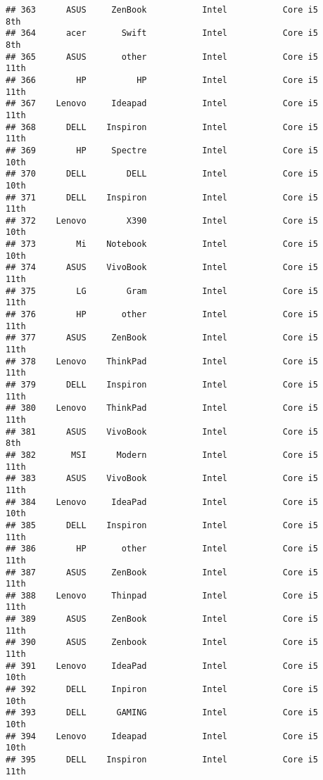\documentclass[
]{article}
\begin{document}
\begin{verbatim}
## 363      ASUS     ZenBook           Intel           Core i5             8th
## 364      acer       Swift           Intel           Core i5             8th
## 365      ASUS       other           Intel           Core i5            11th
## 366        HP          HP           Intel           Core i5            11th
## 367    Lenovo     Ideapad           Intel           Core i5            11th
## 368      DELL    Inspiron           Intel           Core i5            11th
## 369        HP     Spectre           Intel           Core i5            10th
## 370      DELL        DELL           Intel           Core i5            10th
## 371      DELL    Inspiron           Intel           Core i5            11th
## 372    Lenovo        X390           Intel           Core i5            10th
## 373        Mi    Notebook           Intel           Core i5            10th
## 374      ASUS    VivoBook           Intel           Core i5            11th
## 375        LG        Gram           Intel           Core i5            11th
## 376        HP       other           Intel           Core i5            11th
## 377      ASUS     ZenBook           Intel           Core i5            11th
## 378    Lenovo    ThinkPad           Intel           Core i5            11th
## 379      DELL    Inspiron           Intel           Core i5            11th
## 380    Lenovo    ThinkPad           Intel           Core i5            11th
## 381      ASUS    VivoBook           Intel           Core i5             8th
## 382       MSI      Modern           Intel           Core i5            11th
## 383      ASUS    VivoBook           Intel           Core i5            11th
## 384    Lenovo     IdeaPad           Intel           Core i5            10th
## 385      DELL    Inspiron           Intel           Core i5            11th
## 386        HP       other           Intel           Core i5            11th
## 387      ASUS     ZenBook           Intel           Core i5            11th
## 388    Lenovo     Thinpad           Intel           Core i5            11th
## 389      ASUS     ZenBook           Intel           Core i5            11th
## 390      ASUS     Zenbook           Intel           Core i5            11th
## 391    Lenovo     IdeaPad           Intel           Core i5            10th
## 392      DELL     Inpiron           Intel           Core i5            10th
## 393      DELL      GAMING           Intel           Core i5            10th
## 394    Lenovo     Ideapad           Intel           Core i5            10th
## 395      DELL    Inspiron           Intel           Core i5            11th

\end{verbatim}
\end{document}
